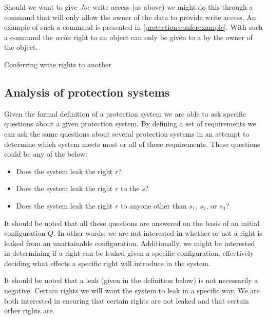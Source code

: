 Should we want to give \textit{Joe} write access (as above) we might do this through a command that will only allow the owner of the data to provide write access.
An example of such a command is presented in \cref{protection:conferexample}.
With such a command the \textit{write} right to an object can only be given to a \ssubject{} by the owner of the object.

\begin{algorithm}
  \DontPrintSemicolon
  \cmd {} 
  \caption{Conferring write rights to another \ssubject{} \cite{HRU}\label{protection:conferexample}}
\end{algorithm}

\subsection{Analysis of protection systems}
Given the formal definition of a protection system we are able to ask specific questions about a given protection system.
By defining a set of requirements we can ask the same questions about several protection systems in an attempt to determine which system meets most or all of these requirements.
These questions could be any of the below:
\begin{itemize}
\item Does the system leak the right $r$?
\item Does the system leak the right $r$ to the \ssubject{} $s$?
\item Does the system leak the right $r$ to anyone other than \ssubject{} $s_1$, $s_2$, or $s_3$?
\end{itemize}
It should be noted that all these questions are answered on the basis of an initial configuration $Q$.
In other words; we are not interested in whether or not a right is leaked from an unattainable configuration.
Additionally, we might be interested in determining if a right can be leaked given a specific configuration, effectively deciding what effects a specific right will introduce in the system.

It should be noted that a leak (given in the definition below) is not necessarily a negative.
Certain rights we will want the system to leak in a specific way.
We are both interested in ensuring that certain rights are not leaked and that certain other rights are.

